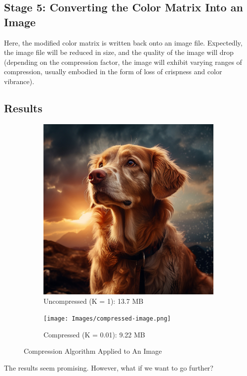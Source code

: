 \documentclass{article}
\begin{document}
\subsection*{Stage 5: Converting the Color Matrix Into an Image}
Here, the modified color matrix is written back onto an image file. Expectedly, the image file
will be reduced in size, and the quality of the image will drop (depending on the compression factor,
the image will exhibit varying ranges of compression, usually embodied in the form of loss of crispness and
color vibrance).

\newpage
\subsection*{Results}
\begin{figure}[h]
 \begin{subfigure}[b]{0.4\textwidth}
    \includegraphics[width=\textwidth]{Images/uncompressed-image.jpg}
    \caption{Uncompressed (K = 1): 13.7 MB}
    \label{fig:f1}
 \end{subfigure}
 \hfill
 \begin{subfigure}[b]{0.4\textwidth}
    \texttt{[image: Images/compressed-image.png]}
    \caption{Compressed (K = 0.01): 9.22 MB}
    \label{fig:f2}
 \end{subfigure}
 \caption{Compression Algorithm Applied to An Image }
\end{figure}
The results seem promising. However, what if we want to go further?
\end{document}
